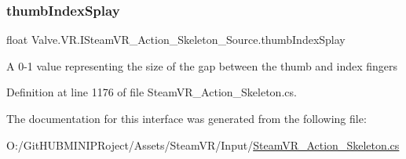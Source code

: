 \subsubsection{\texorpdfstring{thumbIndexSplay}{thumbIndexSplay}}
{\footnotesize\ttfamily float Valve.\+V\+R.\+I\+Steam\+V\+R\+\_\+\+Action\+\_\+\+Skeleton\+\_\+\+Source.\+thumb\+Index\+Splay\hspace{0.3cm}{\ttfamily [get]}}



A 0-\/1 value representing the size of the gap between the thumb and index fingers 



Definition at line 1176 of file Steam\+V\+R\+\_\+\+Action\+\_\+\+Skeleton.\+cs.



The documentation for this interface was generated from the following file\+:\begin{DoxyCompactItemize}
\item 
O\+:/\+Git\+H\+U\+B\+M\+I\+N\+I\+P\+Roject/\+Assets/\+Steam\+V\+R/\+Input/\mbox{\hyperlink{_steam_v_r___action___skeleton_8cs}{Steam\+V\+R\+\_\+\+Action\+\_\+\+Skeleton.\+cs}}\end{DoxyCompactItemize}
